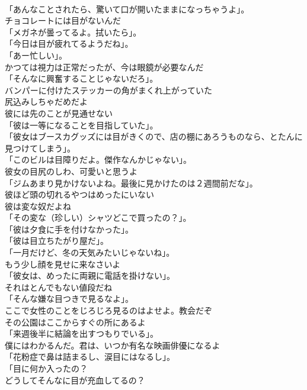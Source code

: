 \documentclass[8pt]{extreport}
\begin{document}
\begin{CJK}{UTF8}{min}
\\	「あんなことされたら、驚いて口が開いたままになっちゃうよ」。	
\\	チョコレートには目がないんだ	
\\	「メガネが曇ってるよ。拭いたら」。	
\\	「今日は目が疲れてるようだね」。	
\\	「あー忙しい」。	
\\	かつては視力は正常だったが、今は眼鏡が必要なんだ	
\\	「そんなに興奮することじゃないだろ」。	
\\	バンパーに付けたステッカーの角がまくれ上がっていた	
\\	尻込みしちゃだめだよ	
\\	彼には先のことが見通せない	
\\	「彼は一等になることを目指していた」。	
\\	「彼女はブースカグッズには目がきくので、店の棚にあろうものなら、とたんに見つけてしまう」。	
\\	「このビルは目障りだよ。傑作なんかじゃない」。	
\\	彼女の目尻のしわ、可愛いと思うよ	
\\	「ジムあまり見かけないよね。最後に見かけたのは２週間前だな」。	
\\	彼ほど頭の切れるやつはめったにいない	
\\	彼は変な奴だよね	
\\	「その変な（珍しい）シャツどこで買ったの？」。	
\\	「彼は夕食に手を付けなかった」。	
\\	「彼は目立ちたがり屋だ」。	
\\	「一月だけど、冬の天気みたいじゃないね」。	
\\	もう少し顔を見せに来なさいよ	
\\	「彼女は、めったに両親に電話を掛けない」。	
\\	それはとんでもない値段だね	
\\	「そんな嫌な目つきで見るなよ」。	
\\	ここで女性のことをじろじろ見るのはよせよ。教会だぞ	
\\	その公園はここからすぐの所にあるよ	
\\	「来週後半に結論を出すつもりでいる」。	
\\	僕にはわかるんだ。君は、いつか有名な映画俳優になるよ	
\\	「花粉症で鼻は詰まるし、涙目にはなるし」。	
\\	「目に何か入ったの？	
\\	どうしてそんなに目が充血してるの？	

\end{CJK}
\end{document}

